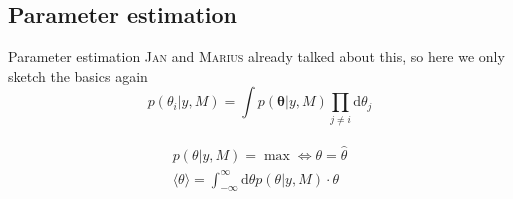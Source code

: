 \documentclass[11pt,aspectratio=1610,dvipsnames]{beamer}
\begin{document}
\subsection{Parameter estimation}
\begin{frame}{Parameter estimation}
	\textsc{Jan} and \textsc{Marius} already talked about this, so here we only sketch the basics again
	\begin{equation}
		\label{eq:marp}
		p(\theta_i|y,M)=\int p(\boldsymbol{\theta}|y,M)\prod_{j\neq i}\text{d}{\theta_j}
	\end{equation}

\begin{align}
	\begin{split}
		p(\theta|y,M)=\max \Leftrightarrow \theta=\hat{\theta}\\
		\langle\theta\rangle=\int_{-\infty}^{\infty}\text{d}\theta  p(\theta|y,M)\cdot\theta
	\end{split}
\end{align}
\end{frame}
\end{document}
